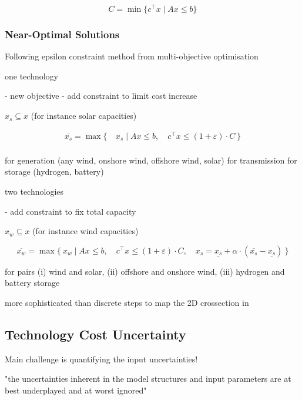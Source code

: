 \begin{equation}
    C = \min\{c^\top x \mid Ax\leq b\}
\end{equation}

\subsubsection{Near-Optimal Solutions}

Following \cite{nearoptimal}
epsilon constraint method from multi-objective optimisation \cite{mavrotas_effective_2009}

one technology

- new objective
- add constraint to limit cost increase

$x_s\subseteq x$ (for instance solar capacities)

\begin{align}
    \overline{x_s} = \max\{\:&x_s \mid Ax\leq b,\quad c^\top x\leq (1+\varepsilon)\cdot C \:\} \\
\end{align}

for generation (any wind, onshore wind, offshore wind, solar)
for transmission
for storage (hydrogen, battery)

two technologies

- add constraint to fix total capacity

$x_w\subseteq x$ (for instance wind capacities)

\begin{equation}
    \overline{x_w} = \max\{\:x_w \mid Ax\leq b,\quad c^\top x\leq (1+\varepsilon)\cdot C, \quad x_s = \underline{x_s} + \alpha \cdot (\overline{x_s}-\underline{x_s}) \:\}
\end{equation}

for pairs
(i) wind and solar,
(ii) offshore and onshore wind,
(iii) hydrogen and battery storage

more sophisticated than discrete steps to map the 2D crossection in \cite{pedersen_modeling_2020}

\subsection{Technology Cost Uncertainty}
\label{sec:uncertainty}

Main challenge is quantifying the input uncertainties! \cite{moret_characterization_2017}

"the uncertainties inherent in the model structures and input parameters are at best underplayed and at worst ignored" \cite{yue_review_2018}

